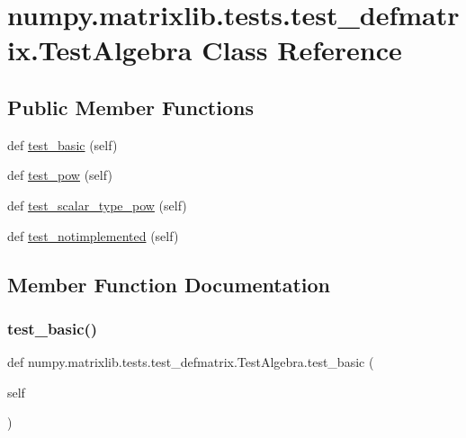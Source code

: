 \hypertarget{classnumpy_1_1matrixlib_1_1tests_1_1test__defmatrix_1_1TestAlgebra}{}\section{numpy.\+matrixlib.\+tests.\+test\+\_\+defmatrix.\+Test\+Algebra Class Reference}
\label{classnumpy_1_1matrixlib_1_1tests_1_1test__defmatrix_1_1TestAlgebra}
\subsection*{Public Member Functions}
\begin{DoxyCompactItemize}
\item 
def \hyperlink{classnumpy_1_1matrixlib_1_1tests_1_1test__defmatrix_1_1TestAlgebra_a23b012e812c42da806968dd755131f1f}{test\+\_\+basic} (self)
\item 
def \hyperlink{classnumpy_1_1matrixlib_1_1tests_1_1test__defmatrix_1_1TestAlgebra_a41241193a571fb4b7093225c0b2a2361}{test\+\_\+pow} (self)
\item 
def \hyperlink{classnumpy_1_1matrixlib_1_1tests_1_1test__defmatrix_1_1TestAlgebra_ad91e6e006e2cbd0f16831507f66c7d4c}{test\+\_\+scalar\+\_\+type\+\_\+pow} (self)
\item 
def \hyperlink{classnumpy_1_1matrixlib_1_1tests_1_1test__defmatrix_1_1TestAlgebra_a138f5716e98fb3522e35772976d60ff0}{test\+\_\+notimplemented} (self)
\end{DoxyCompactItemize}


\subsection{Member Function Documentation}
\mbox{\label{classnumpy_1_1matrixlib_1_1tests_1_1test__defmatrix_1_1TestAlgebra_a23b012e812c42da806968dd755131f1f}} 
\subsubsection{\texorpdfstring{test\+\_\+basic()}{test\_basic()}}
{\footnotesize\ttfamily def numpy.\+matrixlib.\+tests.\+test\+\_\+defmatrix.\+Test\+Algebra.\+test\+\_\+basic (\begin{DoxyParamCaption}\item[{}]{self }\end{DoxyParamCaption})}

